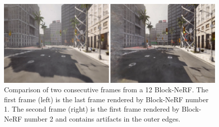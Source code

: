 \begin{figure}[!h]
    \centering
    \includegraphics[width=1.0\textwidth]{figures/block-nerf-frame-comparison.png}
    \caption[Comparison of consecutive frames in a Block-NeRF's overlap.]{Comparison of two consecutive frames from a 12 Block-NeRF. The first frame (left) is the last frame rendered by Block-NeRF number 1. The second frame (right) is the first frame rendered by Block-NeRF number 2 and contains artifacts in the outer edges.}
    \label{fig:block-nerf-frame-comparison}
\end{figure}


